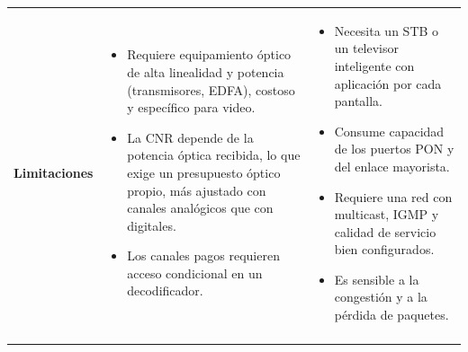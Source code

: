 \begin{table}[H]
\begin{tabular}{p{2.6cm} >{\raggedright\arraybackslash}p{5.9cm} >{\raggedright\arraybackslash}p{5.9cm}}
        \vspace{1pt}\\
        \midrule
        \textbf{Limitaciones} &
        \begin{itemize}[nosep, leftmargin=*, before=\vspace{-0.6\baselineskip}, after=\vspace{-\baselineskip}]
            \item Requiere equipamiento óptico de alta linealidad y potencia (transmisores, EDFA), costoso y específico para video.
            \item La CNR depende de la potencia óptica recibida, lo que exige un presupuesto óptico propio, más ajustado con canales analógicos que con digitales.
            \item Los canales pagos requieren acceso condicional en un decodificador.
        \end{itemize} &
        \begin{itemize}[nosep, leftmargin=*, before=\vspace{-0.6\baselineskip}, after=\vspace{-\baselineskip}]
            \item Necesita un STB o un televisor inteligente con aplicación por cada pantalla.
            \item Consume capacidad de los puertos PON y del enlace mayorista.
            \item Requiere una red con multicast, IGMP y calidad de servicio bien configurados.
            \item Es sensible a la congestión y a la pérdida de paquetes.
        \end{itemize} \\
        \vspace{1pt}\\
        \bottomrule
    \end{tabular}
\end{table}